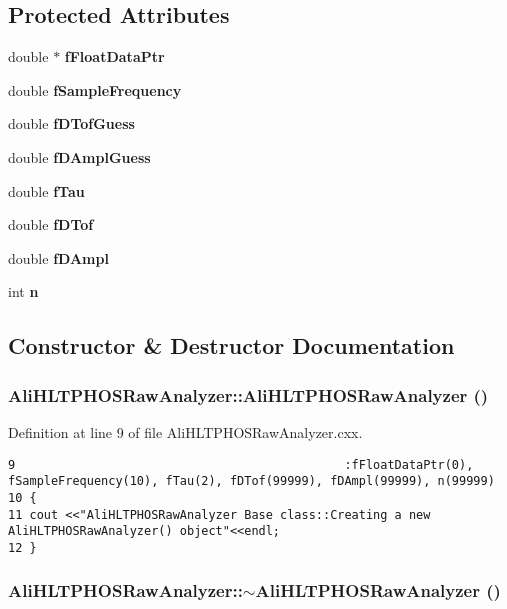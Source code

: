 \subsection*{Protected Attributes}
\begin{CompactItemize}
\item 
double $\ast$ {\bf f\-Float\-Data\-Ptr}
\item 
double {\bf f\-Sample\-Frequency}
\item 
double {\bf f\-DTof\-Guess}
\item 
double {\bf f\-DAmpl\-Guess}
\item 
double {\bf f\-Tau}
\item 
double {\bf f\-DTof}
\item 
double {\bf f\-DAmpl}
\item 
int {\bf n}
\end{CompactItemize}


\subsection{Constructor \& Destructor Documentation}
\subsubsection{\setlength{\rightskip}{0pt plus 5cm}Ali\-HLTPHOSRaw\-Analyzer::Ali\-HLTPHOSRaw\-Analyzer ()}\label{classAliHLTPHOSRawAnalyzer_AliHLTPHOSRawAnalyzera0}




Definition at line 9 of file Ali\-HLTPHOSRaw\-Analyzer.cxx.

\footnotesize\begin{verbatim}9                                              :fFloatDataPtr(0), fSampleFrequency(10), fTau(2), fDTof(99999), fDAmpl(99999), n(99999)
10 {
11 cout <<"AliHLTPHOSRawAnalyzer Base class::Creating a new AliHLTPHOSRawAnalyzer() object"<<endl;
12 }
\end{verbatim}\normalsize 


\subsubsection{\setlength{\rightskip}{0pt plus 5cm}Ali\-HLTPHOSRaw\-Analyzer::$\sim${\bf Ali\-HLTPHOSRaw\-Analyzer} ()\hspace{0.3cm}{\tt  [virtual]}}\label{classAliHLTPHOSRawAnalyzer_AliHLTPHOSRawAnalyzera1}




